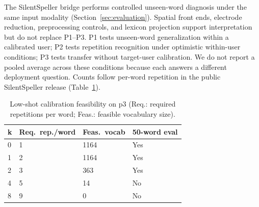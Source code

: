 The SilentSpeller bridge performs controlled unseen-word diagnosis under the same input modality (Section~\ref{sec:evaluation}).
Spatial front ends, electrode reduction, preprocessing controls, and lexicon projection support interpretation but do not replace P1--P3.
P1 tests unseen-word generalization within a calibrated user; P2 tests repetition recognition under optimistic within-user conditions; P3 tests transfer without target-user calibration.
We do not report a pooled average across these conditions because each answers a different deployment question.
Counts follow per-word repetition in the public SilentSpeller release (Table~\ref{tab:calibration_setup}).

\begin{table}[t]
\centering
\caption{Low-shot calibration feasibility on p3 (Req.: required repetitions per word; Feas.: feasible vocabulary size).}
\label{tab:calibration_setup}
\setlength{\tabcolsep}{2pt}
\begin{tabular}{@{}llll@{}}
\toprule
k & Req.\ rep./word & Feas.\ vocab & 50-word eval \\
\midrule
0 & 1 & 1164 & Yes \\
1 & 2 & 1164 & Yes \\
2 & 3 & 363 & Yes \\
4 & 5 & 14 & No \\
8 & 9 & 0 & No \\
\bottomrule
\end{tabular}
\end{table}
